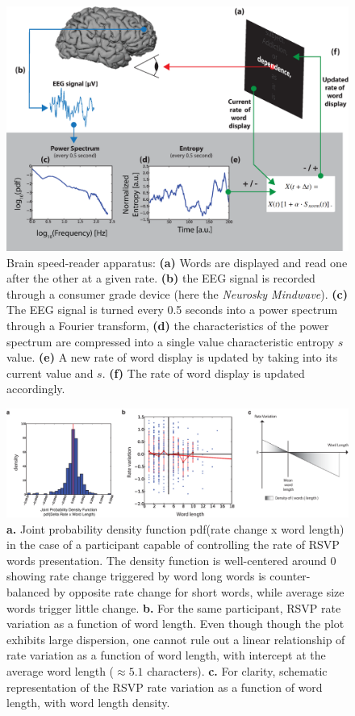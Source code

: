 \documentclass[10pt]{article}
\begin{document}
\begin{figure}[H]
\centering
\includegraphics[width=14cm]{../figures2/apparatus.eps}
\caption{Brain speed-reader apparatus: {\bf (a)} Words are displayed and read one after the other at a given rate. {\bf (b)} the EEG signal is recorded through a consumer grade device (here the {\it Neurosky Mindwave}). {\bf (c)} The EEG signal is turned every 0.5 seconds into a power spectrum through a Fourier transform, {\bf (d)} the characteristics of the power spectrum are compressed into a single value characteristic entropy $s$ value. {\bf (e)} A new rate of word display is updated by taking into its current value and $s$. {\bf (f)} The rate of word display is updated accordingly.}
\label{fig:apparatus}
\end{figure}

\begin{figure}[H]
\centering
\includegraphics[width=17cm]{../figures2/balance.eps}
\caption{{\bf a.} Joint probability density function pdf(rate change x word length) in the case of a participant capable of controlling the rate of RSVP words presentation. The density function is well-centered around $0$ showing rate change triggered by word long words is counter-balanced by opposite rate change for short words, while average size words trigger little change. {\bf b.} For the same participant, RSVP rate variation as a function of word length. Even though though the plot exhibits large dispersion, one cannot rule out a linear relationship of rate variation as a function of word length, with intercept at the average word length ($\approx 5.1$ characters). {\bf c.} For clarity, schematic representation of the RSVP rate variation as a function of word length, with word length density.}
\label{fig:balance}
\end{figure}
\end{document}
